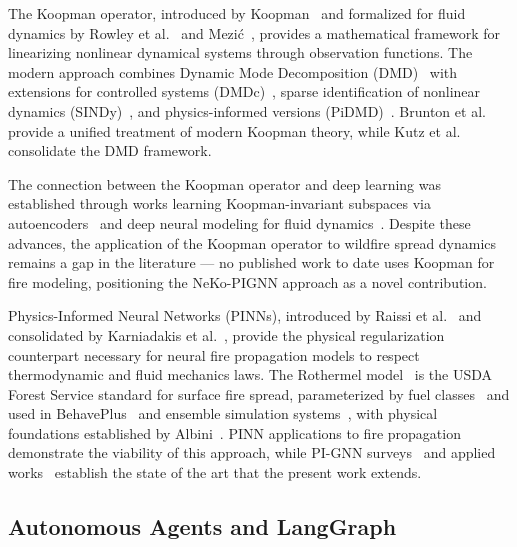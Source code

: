 \documentclass[preprint,12pt,times,numbers]{elsarticle}
\begin{document}
The Koopman operator, introduced by Koopman~\cite{article:koopman1931} and formalized for fluid dynamics by Rowley et al.~\cite{article:rowley2009} and Mezić~\cite{article:mezic2013}, provides a mathematical framework for linearizing nonlinear dynamical systems through observation functions. The modern approach combines Dynamic Mode Decomposition (DMD)~\cite{article:schmid2010} with extensions for controlled systems (DMDc)~\cite{article:proctor2016}, sparse identification of nonlinear dynamics (SINDy)~\cite{article:brunton2016sindy}, and physics-informed versions (PiDMD)~\cite{article:baddoo2023}. Brunton et al.~\cite{article:brunton2021} provide a unified treatment of modern Koopman theory, while Kutz et al.~\cite{article:kutz2016} consolidate the DMD framework.

The connection between the Koopman operator and deep learning was established through works learning Koopman-invariant subspaces via autoencoders~\cite{article:lusch2018,article:takeishi2017} and deep neural modeling for fluid dynamics~\cite{article:morton2019}. Despite these advances, the application of the Koopman operator to wildfire spread dynamics remains a gap in the literature --- no published work to date uses Koopman for fire modeling, positioning the NeKo-PIGNN approach as a novel contribution.

Physics-Informed Neural Networks (PINNs), introduced by Raissi et al.~\cite{article:raissi2019} and consolidated by Karniadakis et al.~\cite{article:karniadakis2021}, provide the physical regularization counterpart necessary for neural fire propagation models to respect thermodynamic and fluid mechanics laws. The Rothermel model~\cite{article:rothermel1972} is the USDA Forest Service standard for surface fire spread, parameterized by fuel classes~\cite{article:scott2001} and used in BehavePlus~\cite{article:andrews2014} and ensemble simulation systems~\cite{article:finney2011}, with physical foundations established by Albini~\cite{article:albini1976}. PINN applications to fire propagation~\cite{article:vogiatzoglou2024,article:mao2024pinn} demonstrate the viability of this approach, while PI-GNN surveys~\cite{article:gigante2025} and applied works~\cite{article:gao2023,article:li2025} establish the state of the art that the present work extends.

\subsection{Autonomous Agents and LangGraph}
\end{document}
